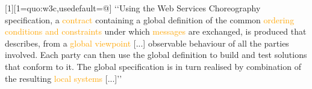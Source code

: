   [1][1=quo:w3c,usedefault=@]{
	 \renewcommand{\baselinestretch}{-.15}
		\lq\lq Using the Web Services Choreography specification, a
		\textcolor{orange}{contract} containing a global definition of the
		common \textcolor{orange}{ordering conditions and constraints}
		under which \textcolor{orange}{messages} are exchanged, is
		produced that describes, from a \textcolor{orange}{global
		  viewpoint} [...]  observable behaviour of all the parties
		involved.
		\textcolor{OliveGreen}{Each party} can then use the global definition to
		\textcolor{OliveGreen}{build and test solutions that conform to it}.
		The global specification is in turn \textcolor{OliveGreen}{realised by combination of} the
		resulting \textcolor{orange}{local systems} [...]\rq\rq
  }


